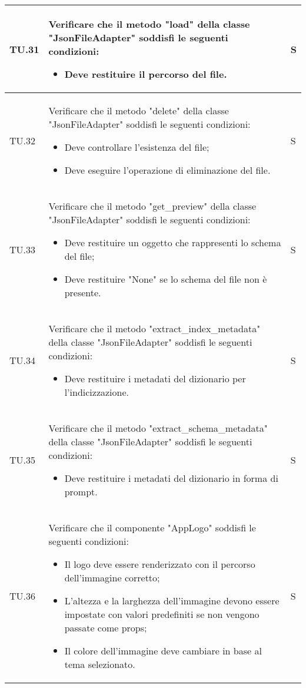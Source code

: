 \begin{adjustwidth}{-0.5cm}{-0.5cm}
\begin{longtable}{|P{1.5cm}|>{\raggedright}P{9.5cm}|>{\arraybackslash}P{1.5cm}|}
		\hline TU.31 & Verificare che il metodo "load" della classe "JsonFileAdapter" soddisfi le seguenti condizioni:
		\begin{itemize}
			\item Deve restituire il percorso del file.
		\end{itemize} & S \\

		\hline TU.32 & Verificare che il metodo "delete" della classe "JsonFileAdapter" soddisfi le seguenti condizioni:
		\begin{itemize}
			\item Deve controllare l'esistenza del file;
			\item Deve eseguire l'operazione di eliminazione del file.
		\end{itemize} & S \\

		\hline TU.33 & Verificare che il metodo "get\_preview" della classe "JsonFileAdapter" soddisfi le seguenti condizioni:
		\begin{itemize}
			\item Deve restituire un oggetto che rappresenti lo schema del file;
			\item Deve restituire "None" se lo schema del file non è presente.
		\end{itemize} & S \\

		\hline TU.34 & Verificare che il metodo "extract\_index\_metadata" della classe "JsonFileAdapter" soddisfi le seguenti condizioni:
		\begin{itemize}
			\item Deve restituire i metadati del dizionario per l'indicizzazione.
		\end{itemize} & S \\

		\hline TU.35 & Verificare che il metodo "extract\_schema\_metadata" della classe "JsonFileAdapter" soddisfi le seguenti condizioni:
		\begin{itemize}
			\item Deve restituire i metadati del dizionario in forma di prompt.
		\end{itemize} & S \\

		\hline TU.36 & Verificare che il componente "AppLogo" soddisfi le seguenti condizioni:
    \begin{itemize}
      \item Il logo deve essere renderizzato con il percorso dell'immagine corretto;
			\item L'altezza e la larghezza dell'immagine devono essere impostate con valori predefiniti se non vengono passate come props;
			\item Il colore dell'immagine deve cambiare in base al tema selezionato.
    \end{itemize} & S \\


\end{longtable}
\end{adjustwidth}
